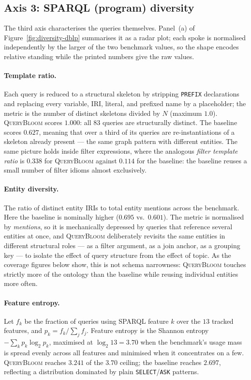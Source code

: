 \subsection{Axis 3: SPARQL (program) diversity}

The third axis characterises the queries themselves. Panel~(a) of
Figure~\ref{fig:diversity-dblp} summarises it as a radar plot; each spoke is normalised
independently by the larger of the two benchmark values, so the shape encodes relative
standing while the printed numbers give the raw values.

\paragraph{Template ratio.} Each query is reduced to a structural skeleton by stripping
\texttt{PREFIX} declarations and replacing every variable, IRI, literal, and prefixed name
by a placeholder; the metric is the number of distinct skeletons divided by $N$ (maximum
$1.0$). \textsc{QueryBloom} scores $1.000$: all $83$ queries are structurally distinct. The
baseline scores $0.627$, meaning that over a third of its queries are re-instantiations of a
skeleton already present --- the same graph pattern with different entities. The same
picture holds inside filter expressions, where the analogous \emph{filter template ratio}
is $0.338$ for \textsc{QueryBloom} against $0.114$ for the baseline: the baseline reuses a
small number of filter idioms almost exclusively.

\paragraph{Entity diversity.} The ratio of distinct entity IRIs to total entity mentions
across the benchmark. Here the baseline is nominally higher ($0.695$ vs.\ $0.601$). The
metric is normalised by \emph{mentions}, so it is mechanically depressed by queries that
reference several entities at once, and \textsc{QueryBloom} deliberately revisits the same
entities in different structural roles --- as a filter argument, as a join anchor, as a
grouping key --- to isolate the effect of query structure from the effect of topic. As the
coverage figures below show, this is not schema narrowness: \textsc{QueryBloom} touches
strictly more of the ontology than the baseline while reusing individual entities more
often.

\paragraph{Feature entropy.} Let $f_k$ be the fraction of queries using SPARQL feature $k$
over the $13$ tracked features, and $p_k=f_k/\sum_j f_j$. Feature entropy is the Shannon
entropy $-\sum_k p_k\log_2 p_k$, maximised at $\log_2 13 = 3.70$ when the benchmark's usage
mass is spread evenly across all features and minimised when it concentrates on a few.
\textsc{QueryBloom} reaches $3.241$ of the $3.70$ ceiling; the baseline reaches $2.697$,
reflecting a distribution dominated by plain \texttt{SELECT}/\texttt{ASK} patterns.

